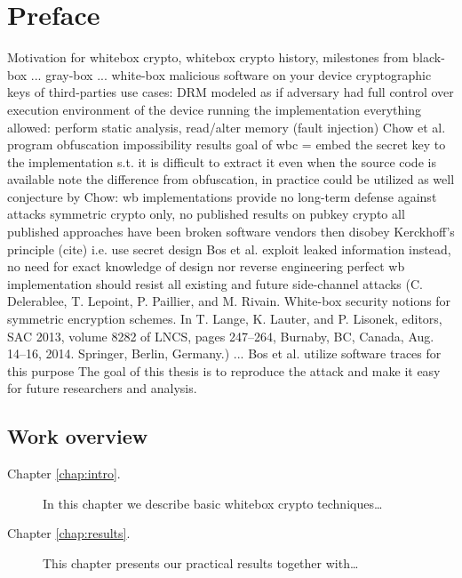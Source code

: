 \cleardoublepage{}   %
\chapter*{Preface}


Motivation for whitebox crypto, whitebox crypto history, milestones   %
	from black-box ... gray-box ... white-box
	malicious software on your device
	cryptographic keys of third-parties
	use cases: DRM
	modeled as if adversary had full control over execution environment of the device running the implementation
	everything allowed: perform static analysis, read/alter memory (fault injection)
	Chow et al. \cite{chow2003white}
	program obfuscation impossibility results
	goal of wbc = embed the secret key to the implementation s.t. it is difficult to extract it even when the source code is available
	note the difference from obfuscation, in practice could be utilized as well
	conjecture by Chow: wb implementations provide no long-term defense against attacks
	symmetric crypto only, no published results on pubkey crypto
	all published approaches have been broken
	software vendors then disobey Kerckhoff's principle (cite) i.e. use secret design
	Bos et al. exploit leaked information instead, no need for exact knowledge of design nor reverse engineering
	perfect wb implementation should resist all existing and future side-channel attacks (C. Delerablee, T. Lepoint, P. Paillier, and M. Rivain. White-box security notions for symmetric encryption schemes. In T. Lange, K. Lauter, and P. Lisonek, editors, SAC 2013, volume 8282 of LNCS, pages 247–264, Burnaby, BC, Canada, Aug. 14–16, 2014. Springer, Berlin, Germany.)
	... Bos et al. utilize software traces for this purpose
	The goal of this thesis is to reproduce the attack and make it easy for future researchers and analysis.

\section*{Work overview}
	
	\begin{description}
		\item[Chapter \ref{chap:intro}.] In this chapter we describe basic whitebox crypto techniques\ldots
		\item[Chapter \ref{chap:results}.] This chapter presents our practical results together with\ldots
	\end{description}

